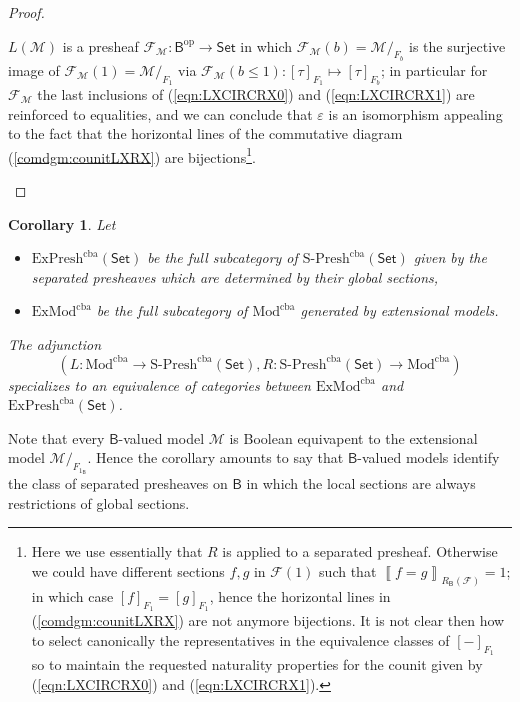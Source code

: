 \documentclass[11pt]{amsart}
\newcommand{\Mod}{\textrm{Mod}}
\newcommand{\F}{\mathcal{F}}
\newcommand{\SPresh}{\textrm{S-Presh}}
\newcommand{\exPresh}{\textrm{ExPresh}}
\newcommand{\modxx}{\Mod^{\textrm{cba}}}
\newcommand{\exmodxx}{\textrm{ExMod}^{\textrm{cba}}}
\theoremstyle{plain}
\newtheorem{corollary}[theorem]{Corollary}
\theoremstyle{definition}
\theoremstyle{plain}
\theoremstyle{remark}
\newcommand{\M}{\mathcal{M}}
\newcommand{\dSet}{\mathsf{Set}}
\DeclareMathOperator{\CLOP}{\mathsf{CLOP}}
\newcommand{\bool}[1]{\mathsf{#1}}
\newcommand{\cp}[1]{\left( #1 \right)}
\newcommand{\Qp}[1]{\left\llbracket #1 \right\rrbracket}
\newcommand{\0}{\mathsf{0}}
\renewcommand{\1}{\mathsf{1}}
\renewcommand{\2}{\mathsf{2}}
\theoremstyle{definition}
\begin{document}
\begin{proof}
\begin{itemize}
$L(\M)$ is a presheaf $\F_\M:\bool{B}^{\textrm{op}}\to\dSet$ in which $\F_\M(b)=\M/_{F_b}$ is the surjective image of $\F_\M(1)=\M/_{F_1}$ via
$\F_\M(b\leq 1):[\tau]_{F_1}\mapsto[\tau]_{F_b}$; in particular for $\F_\M$ the last inclusions of (\ref{eqn:LXCIRCRX0}) and (\ref{eqn:LXCIRCRX1}) are reinforced to equalities, and we can conclude that $\varepsilon$ is an isomorphism appealing to the fact that the horizontal lines of the commutative diagram (\ref{comdgm:counitLXRX}) are bijections\footnote{Here we use essentially that $R$ is applied to 
a separated presheaf. Otherwise we could have different sections $f,g$ in 
$\F(1)$ such that $\Qp{f=g}_{R_\bool{B}(\F)}=1$; in which case $[f]_{F_1}=[g]_{F_1}$, hence the horizontal lines in (\ref{comdgm:counitLXRX}) are not anymore bijections. It is not clear then how to select canonically the representatives in the equivalence classes of $[-]_{F_1}$ so to maintain the requested naturality properties for the counit given by (\ref{eqn:LXCIRCRX0}) and (\ref{eqn:LXCIRCRX1}).}.
\end{itemize}
\end{proof}
\begin{corollary}\label{cor:adjbvmodpresh}
\label{eq:ex}
Let
\begin{itemize}
\item $\exPresh^{\textrm{cba}}(\dSet)$ be the full subcategory of $\SPresh^{\textrm{cba}}(\dSet)$ 
given by the separated presheaves 
which are determined by their global sections,
\item 
$\exmodxx$ be the full subcategory of $\modxx$ generated by extensional models.
\end{itemize}
The adjunction 
\[
\cp{L:\modxx\to\SPresh^{\textrm{cba}}( \dSet), R:\SPresh^{\textrm{cba}}(\dSet)\to\modxx}
\] 
specializes to an equivalence of categories between 
$\exmodxx$ and $\exPresh^{\textrm{cba}}(\dSet)$.
\end{corollary}
Note that every $\bool{B}$-valued model $\M$ is Boolean equivapent to the extensional 
model $\M/_{F_{1_{\bool{B}}}}$.
Hence the corollary amounts to say that $\bool{B}$-valued models  identify the class of separated
presheaves on $\bool{B}$ in 
which the local sections are always restrictions of global sections.
\end{document}
